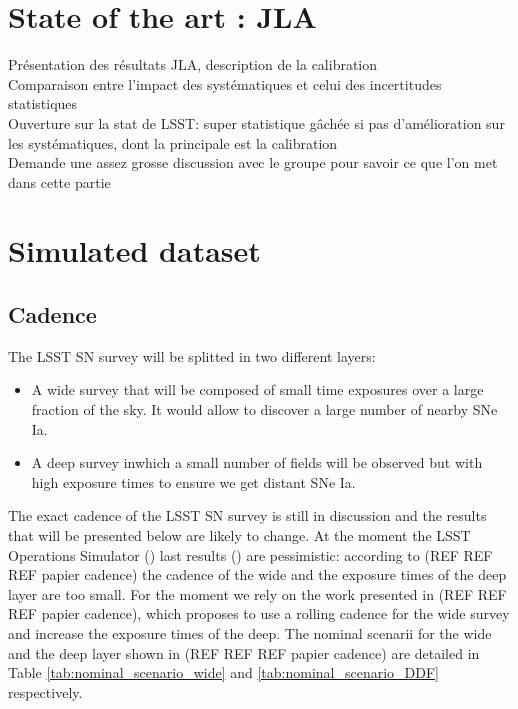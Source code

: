 \documentclass[\docopts]{\docclass}
\begin{document}

\section{State of the art : JLA}
\label{sec::jla}

Présentation des résultats JLA, description de la calibration \\
Comparaison entre l'impact des systématiques et celui des incertitudes statistiques \\
Ouverture sur la stat de LSST: super statistique gâchée si pas d'amélioration sur les systématiques, dont la principale est la calibration \\
Demande une assez grosse discussion avec le groupe pour savoir ce que l'on met dans cette partie


\section{Simulated dataset}
\label{sec::simulated_dataset}

\subsection{Cadence}
\label{subsec::cadence}

The LSST SN survey will be splitted in two different layers:
\begin{itemize}
\item A wide survey that will be composed of small time exposures over a large fraction of the sky.
  It would allow to discover a large number of nearby SNe Ia.
\item A deep survey inwhich a small number of fields will be observed but with high exposure times to ensure we get distant SNe Ia.
\end{itemize}
The exact cadence of the LSST SN survey is still in discussion and the results that will be presented below are likely to change.
At the moment the LSST Operations Simulator () last results () are pessimistic: according to (REF REF REF papier cadence) the cadence of the wide and the exposure times of the deep layer are too small.
For the moment we rely on the work presented in (REF REF REF papier cadence), which proposes to use a rolling cadence for the wide survey and increase the exposure times of the deep. The nominal scenarii for the wide and the deep layer shown in (REF REF REF papier cadence) are detailed in Table \ref{tab:nominal_scenario_wide} and \ref{tab:nominal_scenario_DDF} respectively.
\end{document}
